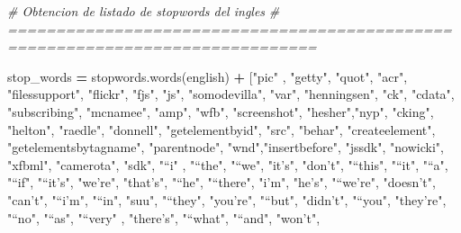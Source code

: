 \documentclass[
  11pt,
  a4paper,
]{article}
\newenvironment{Shaded}{\begin{snugshade}}{\end{snugshade}}
\newcommand{\CommentTok}[1]{\textcolor[rgb]{0.56,0.35,0.01}{\textit{#1}}}
\newcommand{\NormalTok}[1]{#1}
\newcommand{\OperatorTok}[1]{\textcolor[rgb]{0.81,0.36,0.00}{\textbf{#1}}}
\newcommand{\StringTok}[1]{\textcolor[rgb]{0.31,0.60,0.02}{#1}}
\begin{document}
\begin{Shaded}
\begin{Highlighting}[]
\CommentTok{\# Obtencion de listado de stopwords del ingles}
\CommentTok{\# ==============================================================================}

\NormalTok{stop\_words }\OperatorTok{=}\NormalTok{ stopwords.words(}\StringTok{\textquotesingle{}english\textquotesingle{}}\NormalTok{) }\OperatorTok{+}\NormalTok{ [}\StringTok{"pic"}\NormalTok{ , }\StringTok{"getty"}\NormalTok{, }\StringTok{"quot"}\NormalTok{, }\StringTok{"acr"}\NormalTok{, }\StringTok{"filessupport"}\NormalTok{, }\StringTok{"flickr"}\NormalTok{, }\StringTok{"fjs"}\NormalTok{, }\StringTok{"js"}\NormalTok{, }\StringTok{"somodevilla"}\NormalTok{, }\StringTok{"var"}\NormalTok{, }\StringTok{"henningsen"}\NormalTok{,}
\StringTok{"ck"}\NormalTok{, }\StringTok{"cdata"}\NormalTok{, }\StringTok{"subscribing"}\NormalTok{, }\StringTok{"mcnamee"}\NormalTok{, }\StringTok{"amp"}\NormalTok{, }\StringTok{"wfb"}\NormalTok{, }\StringTok{"screenshot"}\NormalTok{, }\StringTok{"hesher"}\NormalTok{,}\StringTok{"nyp"}\NormalTok{, }\StringTok{"cking"}\NormalTok{, }\StringTok{"helton"}\NormalTok{, }\StringTok{"raedle"}\NormalTok{, }\StringTok{"donnell"}\NormalTok{,}
\StringTok{"getelementbyid"}\NormalTok{, }\StringTok{"src"}\NormalTok{, }\StringTok{"behar"}\NormalTok{, }\StringTok{"createelement"}\NormalTok{, }\StringTok{"getelementsbytagname"}\NormalTok{, }\StringTok{"parentnode"}\NormalTok{, }\StringTok{"wnd"}\NormalTok{,}\StringTok{"insertbefore"}\NormalTok{,}
\StringTok{"jssdk"}\NormalTok{, }\StringTok{"nowicki"}\NormalTok{, }\StringTok{"xfbml"}\NormalTok{, }\StringTok{"camerota"}\NormalTok{, }\StringTok{"sdk"}\NormalTok{,  }\StringTok{"“i"}\NormalTok{ , }\StringTok{"“the"}\NormalTok{, }\StringTok{"“we"}\NormalTok{, }\StringTok{"it’s"}\NormalTok{, }\StringTok{"don’t"}\NormalTok{, }\StringTok{"“this"}\NormalTok{, }\StringTok{"“it"}\NormalTok{, }\StringTok{"“a"}\NormalTok{,}
\StringTok{"“if"}\NormalTok{,  }\StringTok{"“it’s"}\NormalTok{, }\StringTok{"we’re"}\NormalTok{, }\StringTok{"that’s"}\NormalTok{,  }\StringTok{"“he"}\NormalTok{, }\StringTok{"“there"}\NormalTok{, }\StringTok{"i’m"}\NormalTok{,  }\StringTok{"he’s"}\NormalTok{,  }\StringTok{"“we’re"}\NormalTok{, }\StringTok{"doesn’t"}\NormalTok{, }\StringTok{"can’t"}\NormalTok{, }\StringTok{"“i’m"}\NormalTok{, }\StringTok{"“in"}\NormalTok{,}
\StringTok{"suu"}\NormalTok{, }\StringTok{"“they"}\NormalTok{, }\StringTok{"you’re"}\NormalTok{, }\StringTok{"“but"}\NormalTok{, }\StringTok{"didn’t"}\NormalTok{, }\StringTok{"“you"}\NormalTok{, }\StringTok{"they’re"}\NormalTok{, }\StringTok{"“no"}\NormalTok{, }\StringTok{"“as"}\NormalTok{, }\StringTok{"“very"}\NormalTok{ , }\StringTok{"there’s"}\NormalTok{, }\StringTok{"“what"}\NormalTok{,  }\StringTok{"“and"}\NormalTok{, }\StringTok{"won’t"}\NormalTok{,}

\end{Highlighting}
\end{Shaded}
\end{document}
